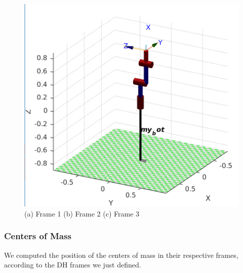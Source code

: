 \documentclass{article}
\begin{document}
\begin{center}
\begin{figure}[!htb]
\begin{minipage}{0.33\textwidth}
   \end{minipage}\hfill
   \begin{minipage}{0.33\textwidth}
     \centering
     \includegraphics[width=\linewidth]{images/3-dof/frame3_q2_90.png}
   \end{minipage}
   \caption{(a) Frame 1 (b) Frame 2 (c) Frame 3}

\end{figure} 
\end{center}
\FloatBarrier

\subsubsection*{Centers of Mass}
We computed the position of the centers of mass in their respective frames, according to the DH frames we just defined.
\end{document}
